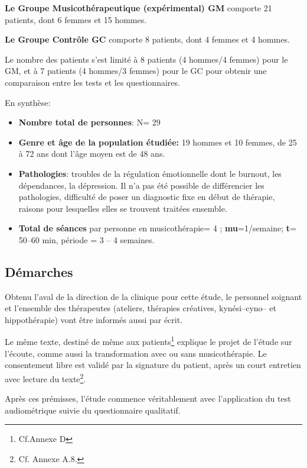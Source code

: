 \textbf{Le Groupe Musicothérapeutique (expérimental) GM} comporte 21
patients, dont 6
femmes et 15 hommes.

\textbf{Le  Groupe Contrôle GC} comporte 8 patients, dont 4 femmes et 4 hommes.

Le nombre
des patients s'est limité  à 8
patients (4 hommes/4 femmes) pour le GM, et à 7 patients (4 hommes/3
femmes) pour le GC pour obtenir une comparaison entre les tests et les questionnaires.




En synthèse:
 \begin{itemize}
 
 \item \textbf{Nombre total de personnes}: N= 29 
\item\textbf{Genre et âge de la population étudiée:}  19 hommes et 10 femmes, de 25 à 72
  ans dont l'âge moyen est de 48 ans.
 \item\textbf{Pathologies}: troubles de la régulation émotionnelle
   dont le burnout, les dépendances, la dépression.
   Il n'a pas été
   possible de différencier les pathologies, difficulté de poser un
   diagnostic fixe en début de thérapie, raisons pour lesquelles elles
   se trouvent traitées ensemble.
 \item \textbf{Total de séances} par personne en
   musicothérapie= 4 ;   \textbf{mu}=1/semaine;  
 \textbf{t}= 50--60 min, période = 3 -- 4 semaines.
\end{itemize}




\subsection{Démarches}
Obtenu l'aval de la direction de la
clinique pour cette étude,  le personnel soignant et l'ensemble des
thérapeutes (ateliers, thérapies créatives, kynési--cyno--
et hippothérapie) vont être informés aussi par écrit.

Le même texte, destiné de même aux
patients\footnote{Cf.Annexe D} explique le projet de l'étude sur l'écoute, comme aussi la transformation
avec ou sans musicothérapie.
Le consentement libre est validé par la signature du patient, après
un court entretien avec lecture du texte\footnote{Cf. Annexe A.8.}.


Après ces prémisses, l'étude commence véritablement avec l'application du test
audiométrique suivie du questionnaire qualitatif.

